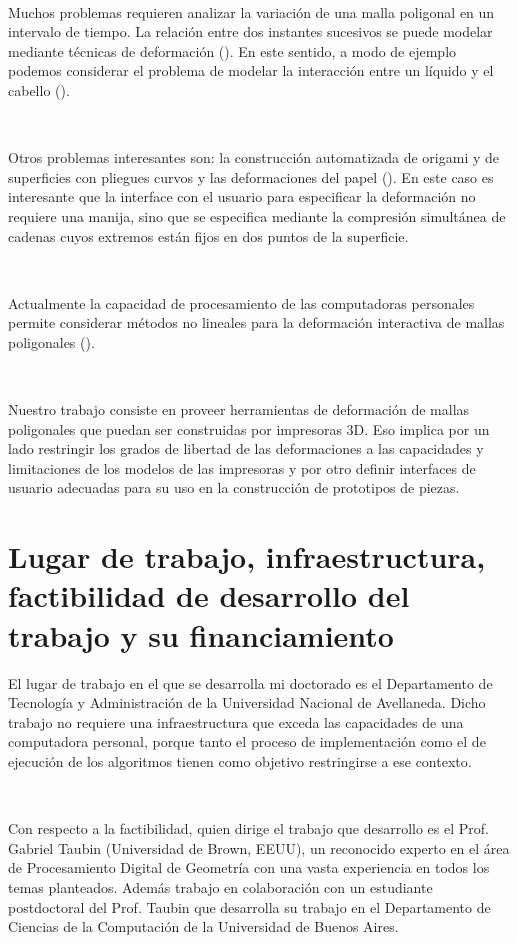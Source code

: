 \documentclass{article}
\begin{document}
\

Muchos problemas requieren analizar la variación de una malla poligonal 
en un intervalo de tiempo. La relación entre dos instantes sucesivos se 
puede modelar mediante técnicas de deformación (\cite{PKCCH:2017}). En este 
sentido, a modo de ejemplo podemos considerar el problema de modelar la 
interacción entre un líquido y el cabello (\cite{FTBZG:2017}).

\

Otros problemas interesantes son: la construcción automatizada 
de origami y de superficies con pliegues curvos y las deformaciones del 
papel (\cite{KMM:2017}). En este caso es interesante que la interface con el usuario para 
especificar la deformación no requiere una manija, sino que se especifica 
mediante la compresión simultánea de cadenas cuyos extremos están fijos 
en dos puntos de la superficie.

\

Actualmente la capacidad de procesamiento de las computadoras personales 
permite considerar métodos no lineales para la deformación interactiva de 
mallas poligonales (\cite{SPSKL:2017}).

\

Nuestro trabajo consiste en proveer herramientas de deformación de mallas 
poligonales que puedan ser construidas por impresoras 3D. Eso implica por 
un lado restringir los grados de libertad de las deformaciones a las capacidades 
y limitaciones de los modelos de las impresoras y por otro definir interfaces 
de usuario adecuadas para su uso en la construcción de prototipos de piezas.


\section{Lugar de trabajo, infraestructura, factibilidad de desarrollo del trabajo y su financiamiento}

El lugar de trabajo en el que se desarrolla mi doctorado es el Departamento 
de Tecnología y Administración de la Universidad Nacional de Avellaneda. 
Dicho trabajo no requiere una infraestructura que exceda las capacidades 
de una computadora personal, porque tanto el proceso de implementación como 
el de ejecución de los algoritmos tienen como objetivo restringirse a ese 
contexto.

\

Con respecto a la factibilidad, quien dirige el trabajo que desarrollo es 
el Prof. Gabriel Taubin (Universidad de Brown, EEUU), un reconocido experto 
en el área de Procesamiento Digital de Geometría con una vasta experiencia 
en todos los temas planteados. Además trabajo en colaboración 
con un estudiante postdoctoral del Prof. Taubin que desarrolla su trabajo 
en el Departamento de Ciencias de la Computación de la Universidad de Buenos 
Aires.
\end{document}

